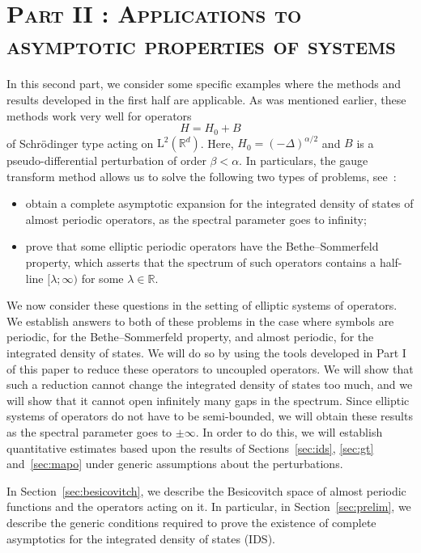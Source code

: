 \documentclass[10pt]{amsart}
\theoremstyle{definition}\newtheorem{defi}[theo]{Definition}\newtheorem{rema}[theo]{Remark}\newtheorem{exam}[theo]{Example}\newtheorem{nota}[theo]{Notation}
\newcommand{\RL}{\mathrm{L}}
\newcommand{\R}{\mathbb R}
\begin{document}
\section*{\textsc{Part II : Applications to asymptotic properties of systems}}


In this second part, we consider some specific examples where the methods and results developed in the first half are applicable. As was mentioned earlier, these methods work very well for operators
\[
H = H_0 + B
\]
of Schr\"odinger type acting on $\RL^2(\R^d)$. Here, $H_0 = (-\Delta)^{\alpha/2}$ and $B$ is a pseudo-differential perturbation of order $\beta < \alpha$. In particulars, the gauge transform method allows us to solve the following two types of problems, see~\cite{barbpar,MorParSht2014,parnovski,
ParSht2016,ParSht2012,ParSob2010,
Sobolev2006}:
\begin{itemize}
\item obtain a complete asymptotic expansion for the integrated density of states of almost periodic operators, as the spectral parameter goes to infinity;
\item prove that some elliptic periodic operators have the Bethe--Sommerfeld property, which asserts that the spectrum of such operators contains a half-line $[\lambda;\infty)$ for some $\lambda \in \R$.
\end{itemize}

We now consider these questions in the setting of elliptic systems of operators. We establish answers to both of these problems in the case where symbols are periodic, for the Bethe--Sommerfeld property, and almost periodic, for the integrated density of states. We will do so by using the tools developed in Part I of this paper to reduce these operators to uncoupled operators. We will show that such a reduction cannot change the integrated density of states too much, and we will show that it cannot open infinitely many gaps in the spectrum. Since elliptic systems of operators do not have to be semi-bounded, we will obtain these results as the spectral parameter goes to $\pm
\infty$. In order to do this, we will establish quantitative estimates based upon the results of Sections~\ref{sec:ids}, \ref{sec:gt} and~\ref{sec:mapo} under generic assumptions about the perturbations.

In Section~\ref{sec:besicovitch}, we describe the Besicovitch space of almost periodic functions and the operators acting on it. In particular, in Section~\ref{sec:prelim}, we describe the generic conditions required to prove the existence of complete asymptotics for the integrated density of states (IDS).
 
\end{document}
